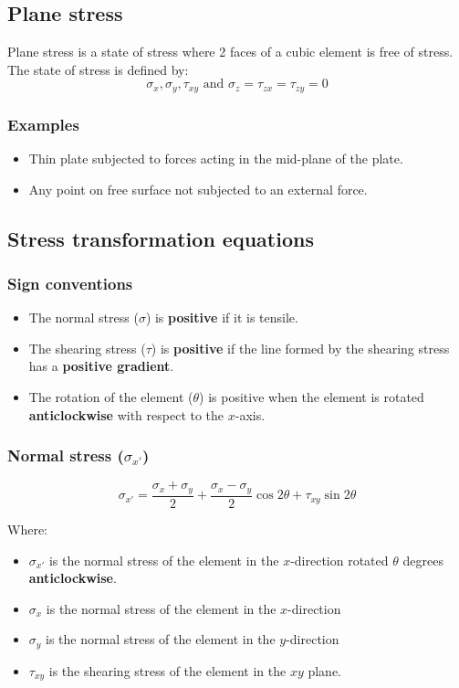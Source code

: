 \documentclass[11pt]{article}
\begin{document}
\subsection{Plane stress}
\label{sec:org5119996}
Plane stress is a state of stress where 2 faces of a cubic element is free of stress. The state of stress is defined by:
\[\sigma_x, \sigma_y, \tau_{xy} \text{ and } \sigma_z = \tau_{zx} = \tau_{zy} = 0\]

\subsubsection{Examples}
\label{sec:orga4b1550}
\begin{itemize}
\item Thin plate subjected to forces acting in the mid-plane of the plate.
\item Any point on free surface not subjected to an external force.
\end{itemize}

\newpage

\subsection{Stress transformation equations}
\label{sec:orgcd33bd7}

\subsubsection{Sign conventions}
\label{sec:orgfa66116}
\begin{itemize}
\item The normal stress (\(\sigma\)) is \textbf{positive} if it is tensile.
\item The shearing stress (\(\tau\)) is \textbf{positive} if the line formed by the shearing stress has a \textbf{positive gradient}.
\item The rotation of the element (\(\theta\)) is positive when the element is rotated \textbf{anticlockwise} with respect to the \(x\)-axis.
\end{itemize}

\subsubsection{Normal stress (\(\sigma_{x'}\))}
\label{sec:org83977ad}
\[\sigma_{x'} = \frac{\sigma_x + \sigma_y}{2} + \frac{\sigma_x - \sigma_y}{2} \cos 2 \theta + \tau_{xy} \sin 2 \theta\]

Where:
\begin{itemize}
\item \(\sigma_{x'}\) is the normal stress of the element in the \(x\)-direction rotated \(\theta\) degrees \textbf{anticlockwise}.
\item \(\sigma_x\) is the normal stress of the element in the \(x\)-direction
\item \(\sigma_y\) is the normal stress of the element in the \(y\)-direction
\item \(\tau_{xy}\) is the shearing stress of the element in the \(xy\) plane.
\end{itemize}
\end{document}
